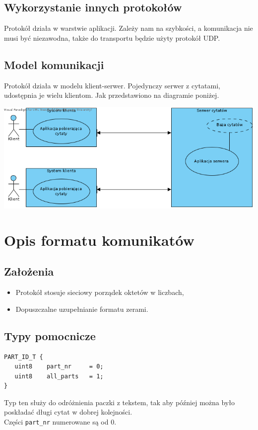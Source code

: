 \documentclass{article}
\begin{document}
\subsection{Wykorzystanie innych protokołów}
Protokół działa w warstwie aplikacji. 
Zależy nam na szybkości, a komunikacja nie musi być niezawodna,
także do transportu będzie użyty protokół UDP.
\subsection{Model komunikacji}
Protokół działa w modelu klient-serwer. Pojedynczy serwer z cytatami, udostępnia je wielu klientom.
Jak przedstawiono na diagramie poniżej.
\begin{center}
\includegraphics[scale=0.6]{model.png}
\end{center}

\section{Opis formatu komunikatów}
\subsection{Założenia}
\begin{itemize}
\item Protokół stosuje sieciowy porządek oktetów w liczbach,
\item Dopuszczalne uzupełnianie formatu zerami. 
\end{itemize}
\subsection{Typy pomocnicze}
\begin{verbatim}
PART_ID_T {
   uint8    part_nr     = 0;
   uint8    all_parts   = 1;
}
\end{verbatim}
Typ ten służy do odróżnienia paczki z tekstem, tak aby później można było poskładać długi cytat w dobrej kolejności.\\
Części \verb+part_nr+ numerowane są od $0$.
\end{document}
